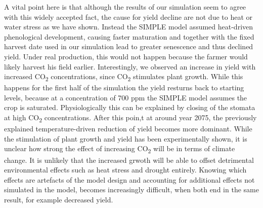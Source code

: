\documentclass[11pt]{article}
\begin{document}
A vital point here is that although the results of our simulation seem to agree with this widely accepted fact, the cause for yield decline are not due to heat or water stress as we have shown. Instead the SIMPLE model assumed heat-driven phenological development, causing faster maturation and together with the fixed harvest date used in our simulation lead to greater senescence and thus declined yield. Under real production, this would not happen because the farmer would likely harvest his field earlier. Interestingly, we observed an increase in yield with increased CO\textsubscript{2} concentrations, since CO\textsubscript{2} stimulates plant growth. While this happens for the first half of the simulation the yield resturns back to starting levels, because at a concentration of 700 ppm the SIMPLE model assumes the crop is saturated. Physiologically this can be explained by closing of the stomata at high CO\textsubscript{2} concentrations. After this poin,t at around year 2075, the previously explained temperature-driven reduction of yield becomes more dominant. While the stimulation of plant growth and yield has been experimentally shown, it is unclear  how strong the effect of increasing CO\textsubscript{2} will be in terms of climate change. It is unlikely that the increased grwoth will be able to offset detrimental environmental effects such as heat stress and drought entirely.
Knowing which effects are artefacts of the model design and accounting for additional effects not simulated in the model, becomes increasingly difficult, when both end in the same result, for example decreased yield.\\
\end{document}
